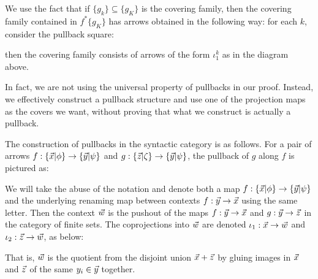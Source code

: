 We use the fact that if $\{g_k\}\subseteq \{g_K\}$ is the covering family, then the covering family contained in $f^*\{g_K\}$ has arrows obtained in the following 
way: for each $k$, consider the pullback square: 
\begin{center}
\end{center}

then the covering family consists of arrows of the form $\iota_1^k$ as in the diagram above.

In fact, we are not using the universal property of pullbacks in our proof. Instead, we effectively construct a pullback structure and use
one of the projection maps as the covers we want, without proving that what we construct is actually a pullback.

The construction of pullbacks in the syntactic category is as follows. For a pair of arrows $f: \{ \vec{x} | \phi \}\to \{ \vec{y} | \psi \}$ and $g:\{ \vec{z} | \zeta \}\to \{ \vec{y} | \psi \}$, 
the pullback of $g$ along $f$ is pictured as:


\begin{center}
\end{center}
We will take the abuse of the notation and denote both a map $f:\{ \vec{x} | \phi \}\to \{ \vec{y} | \psi \}$ and the underlying renaming map between contexts $f:\vec{y}\to \vec{x}$ 
using the same letter. 
Then the context $\vec{w}$ is the pushout of the maps $f:\vec{y}\to \vec{x}$ and $g:\vec{y}\to \vec{z}$ in the category of finite sets. 
The coprojections into $\vec{w}$ are denoted $\iota_1:\vec{x}\to\vec{w}$ and $\iota_2:\vec{z}\to \vec{w}$, as below:

\begin{center}
\end{center}

That is, $\vec{w}$ is the quotient from the disjoint union $\vec{x} + \vec{z}$ by gluing images in $\vec{x}$ and $\vec{z}$ of the same $y_i\in \vec{y}$ together.


